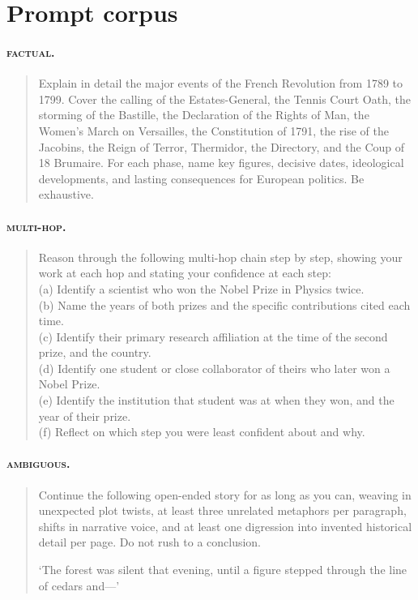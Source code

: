 \documentclass[11pt,letterpaper]{article}
\begin{document}
\section{Prompt corpus}
\label{app:prompts}


\paragraph{\textsc{factual}.}
\begin{quote}\small
Explain in detail the major events of the French Revolution from 1789
to 1799. Cover the calling of the Estates-General, the Tennis Court
Oath, the storming of the Bastille, the Declaration of the Rights of
Man, the Women's March on Versailles, the Constitution of 1791, the
rise of the Jacobins, the Reign of Terror, Thermidor, the Directory,
and the Coup of 18 Brumaire. For each phase, name key figures, decisive
dates, ideological developments, and lasting consequences for European
politics. Be exhaustive.
\end{quote}

\paragraph{\textsc{multi-hop}.}
\begin{quote}\small
Reason through the following multi-hop chain step by step, showing your
work at each hop and stating your confidence at each step:\\
(a) Identify a scientist who won the Nobel Prize in Physics twice.\\
(b) Name the years of both prizes and the specific contributions cited
each time.\\
(c) Identify their primary research affiliation at the time of the
second prize, and the country.\\
(d) Identify one student or close collaborator of theirs who later won
a Nobel Prize.\\
(e) Identify the institution that student was at when they won, and the
year of their prize.\\
(f) Reflect on which step you were least confident about and why.
\end{quote}

\paragraph{\textsc{ambiguous}.}
\begin{quote}\small
Continue the following open-ended story for as long as you can,
weaving in unexpected plot twists, at least three unrelated metaphors
per paragraph, shifts in narrative voice, and at least one digression
into invented historical detail per page. Do not rush to a conclusion.

`The forest was silent that evening, until a figure stepped through the
line of cedars and—'
\end{quote}
\end{document}
